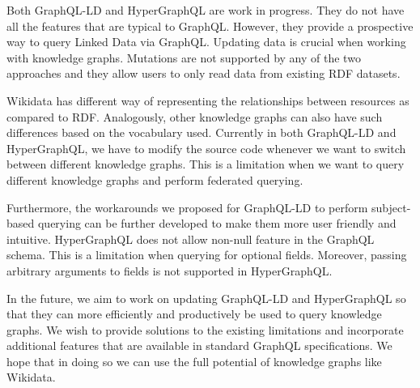 Both GraphQL-LD and HyperGraphQL are work in progress. They do not have all the features that are typical to GraphQL. However, they provide a prospective way to query Linked Data via GraphQL. Updating data is crucial when working with knowledge graphs. Mutations are not supported by any of the two approaches and they allow users to only read data from existing RDF datasets. 

Wikidata has different way of representing the relationships between resources as compared to RDF. Analogously, other knowledge graphs can also have such differences based on the vocabulary used. Currently in both GraphQL-LD and HyperGraphQL, we have to modify the source code whenever we want to switch between different knowledge graphs. This is a limitation when we want to query different knowledge graphs and perform federated querying.

Furthermore, the workarounds we proposed for GraphQL-LD to perform subject-based querying can be further developed to make them more user friendly and intuitive. HyperGraphQL does not allow non-null feature in the GraphQL schema. This is a limitation when querying for optional fields. Moreover, passing arbitrary arguments to fields is not supported in HyperGraphQL. 

In the future, we aim to work on updating GraphQL-LD and HyperGraphQL so that they can more efficiently and productively be used to query knowledge graphs. We wish to provide solutions to the existing limitations and incorporate additional features that are available in standard GraphQL specifications. We hope that in doing so we can use the full potential of knowledge graphs like Wikidata. 
